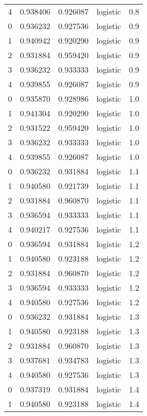\begin{tabular}{rrrlr}
     4 & 0.938406 & 0.926087 & logistic &        0.8 \\
     0 & 0.936232 & 0.927536 & logistic &        0.9 \\
     1 & 0.940942 & 0.920290 & logistic &        0.9 \\
     2 & 0.931884 & 0.959420 & logistic &        0.9 \\
     3 & 0.936232 & 0.933333 & logistic &        0.9 \\
     4 & 0.939855 & 0.926087 & logistic &        0.9 \\
     0 & 0.935870 & 0.928986 & logistic &        1.0 \\
     1 & 0.941304 & 0.920290 & logistic &        1.0 \\
     2 & 0.931522 & 0.959420 & logistic &        1.0 \\
     3 & 0.936232 & 0.933333 & logistic &        1.0 \\
     4 & 0.939855 & 0.926087 & logistic &        1.0 \\
     0 & 0.936232 & 0.931884 & logistic &        1.1 \\
     1 & 0.940580 & 0.921739 & logistic &        1.1 \\
     2 & 0.931884 & 0.960870 & logistic &        1.1 \\
     3 & 0.936594 & 0.933333 & logistic &        1.1 \\
     4 & 0.940217 & 0.927536 & logistic &        1.1 \\
     0 & 0.936594 & 0.931884 & logistic &        1.2 \\
     1 & 0.940580 & 0.923188 & logistic &        1.2 \\
     2 & 0.931884 & 0.960870 & logistic &        1.2 \\
     3 & 0.936594 & 0.933333 & logistic &        1.2 \\
     4 & 0.940580 & 0.927536 & logistic &        1.2 \\
     0 & 0.936232 & 0.931884 & logistic &        1.3 \\
     1 & 0.940580 & 0.923188 & logistic &        1.3 \\
     2 & 0.931884 & 0.960870 & logistic &        1.3 \\
     3 & 0.937681 & 0.934783 & logistic &        1.3 \\
     4 & 0.940580 & 0.927536 & logistic &        1.3 \\
     0 & 0.937319 & 0.931884 & logistic &        1.4 \\
     1 & 0.940580 & 0.923188 & logistic &        1.4 \\

\end{tabular}
